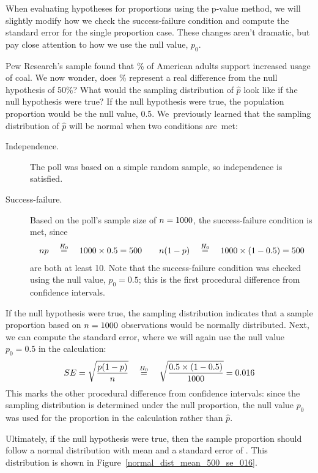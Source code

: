 When evaluating hypotheses for proportions using the
p-value method,
we will slightly modify how we check the success-failure
condition and compute the standard error for the
single proportion case.
These changes aren't dramatic, but pay close attention
to how we use the null value, $p_0$.

\begin{examplewrap}
\begin{nexample}{Pew Research's sample found that
    \pewcoalpollpercent{}\%
    of American adults support increased usage of coal.
    We now wonder, does \pewcoalpollpercent{}\% represent
    a real difference from the null hypothesis of 50\%?
    What would the sampling distribution of $\hat{p}$
    look like if the null hypothesis were true?}
  If the null hypothesis were true, the population proportion
  would be the null value, 0.5.
  We~previously learned that
  the sampling distribution of $\hat{p}$ will be normal when
  two conditions are~met:
  \begin{description}
    \item[Independence.]
        The poll was based on a simple random sample,
        so independence is satisfied.
    \item[Success-failure.]
        Based on the poll's sample size of
        $n = 1000{}$,
        the success-failure condition is met, since
        \begin{align*}
        np \quad \stackrel{H_0}{=}
            \quad 1000{} \times 0.5{} = 500
        \qquad
        n (1 - p) \quad \stackrel{H_0}{=}
            \quad 1000{} \times (1 - 0.5{}) = 500
        \end{align*}
        are both at least 10.
        Note that the success-failure condition was checked
        using the null value, $p_0 = 0.5$;
        this is the first procedural difference from
        confidence intervals.
  \end{description}
  If the null hypothesis were true, the sampling distribution
  indicates that a sample proportion based on
  $n = 1000{}$ observations
  would be normally distributed. Next, we can compute the standard
  error, where we will again use the null value $p_0 = 0.5$ in the
  calculation:
  \begin{align*}
  SE = \sqrt{\frac{p (1 - p)}{n}}
      \quad \stackrel{H_0}{=}
          \quad \sqrt{\frac{0.5{} \times (1 - 0.5{})}{1000{}}}
      = 0.016{}
  \end{align*}
  This marks the other procedural difference from confidence
  intervals: since the sampling distribution is determined
  under the null proportion, the null value $p_0$ was used for
  the proportion in the calculation rather than $\hat{p}$.

  Ultimately, if the null hypothesis were true, then the sample
  proportion should follow a normal distribution with mean
  \pewcoalpollnullvalue{}
  and a standard error of \pewcoalpollnullse{}.
  This distribution is shown in
  Figure~\ref{normal_dist_mean_500_se_016}.
\end{nexample}
\end{examplewrap}

